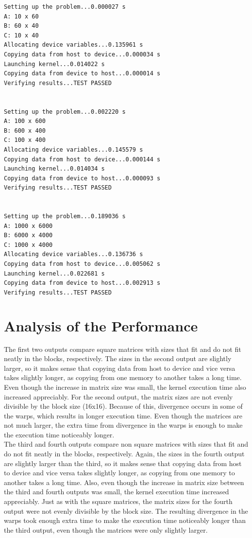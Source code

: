 \documentclass{article}
\begin{document}
\begin{lstlisting}[basicstyle=\ttfamily]
Setting up the problem...0.000027 s
A: 10 x 60
B: 60 x 40
C: 10 x 40
Allocating device variables...0.135961 s
Copying data from host to device...0.000034 s
Launching kernel...0.014022 s
Copying data from device to host...0.000014 s
Verifying results...TEST PASSED


Setting up the problem...0.002220 s
A: 100 x 600
B: 600 x 400
C: 100 x 400
Allocating device variables...0.145579 s
Copying data from host to device...0.000144 s
Launching kernel...0.014034 s
Copying data from device to host...0.000093 s
Verifying results...TEST PASSED


Setting up the problem...0.189036 s
A: 1000 x 6000
B: 6000 x 4000
C: 1000 x 4000
Allocating device variables...0.136736 s
Copying data from host to device...0.005062 s
Launching kernel...0.022681 s
Copying data from device to host...0.002913 s
Verifying results...TEST PASSED
\end{lstlisting}


\section{Analysis of the Performance}

The first two outputs compare square matrices with sizes that fit and do not fit neatly in the blocks, respectively. The sizes in the second output are slightly larger, so it makes sense that copying data from host to device and vice versa takes slightly longer, as copying from one memory to another takes a long time. Even though the increase in matrix size was small, the kernel execution time also increased appreciably. For the second output, the matrix sizes are not evenly divisible by the block size (16x16). Because of this, divergence occurs in some of the warps, which results in longer execution time. Even though the matrices are not much larger, the extra time from divergence in the warps is enough to make the execution time noticeably longer. \\

The third and fourth outputs compare non square matrices with sizes that fit and do not fit neatly in the blocks, respectively. Again, the sizes in the fourth output are slightly larger than the third, so it makes sense that copying data from host to device and vice versa takes slightly longer, as copying from one memory to another takes a long time. Also, even though the increase in matrix size between the third and fourth outputs was small, the kernel execution time increased appreciably. Just as with the square matrices, the matrix sizes for the fourth output were not evenly divisible by the block size. The resulting divergence in the warps took enough extra time to make the execution time noticeably longer than the third output, even though the matrices were only slightly larger. \\
\end{document}

